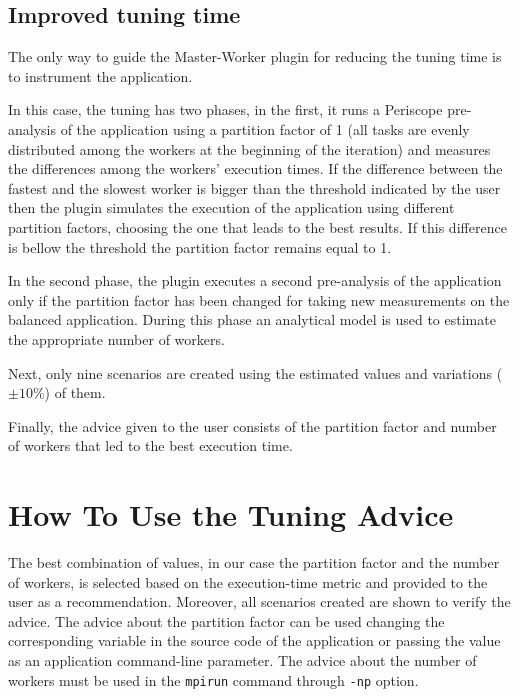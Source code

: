 \documentclass[11pt,a4paper, oneside]{book} %
\begin{document}
\section{Improved tuning time}
The only way to guide the Master-Worker plugin for reducing the tuning time is to instrument the application.

In this case, the tuning has two phases, in the first, it runs a Periscope pre-analysis of the application using a partition factor of 1 (all tasks are evenly distributed among the workers at the beginning of the iteration) and measures the differences among the workers' execution times. If the difference between the fastest and the slowest worker is bigger than the threshold indicated by the user then the plugin simulates the execution of the application using different partition factors, choosing the one that leads to the best results. If this difference is bellow the threshold the partition factor remains equal to 1.

In the second phase, the plugin executes a second pre-analysis of the application only if the partition factor has been changed for taking new measurements on the balanced application. During this phase an analytical model is used to estimate the appropriate number of workers.

Next, only nine scenarios are created using the estimated values and variations ($\pm10\%$) of them.

Finally, the advice given to the user consists of the partition factor and number of workers that led to the best execution time.


\chapter{How To Use the Tuning Advice}
The best combination of values, in our case the partition factor and the number of workers, is selected based on the execution-time metric and provided to the user as a recommendation. Moreover, all scenarios created are shown to verify the advice. The advice about the partition factor can be used changing the corresponding variable in the source code of the application or passing the value as an application command-line parameter. The advice about the number of workers must be used in the {\tt mpirun} command through {\tt -np} option.
\end{document}
